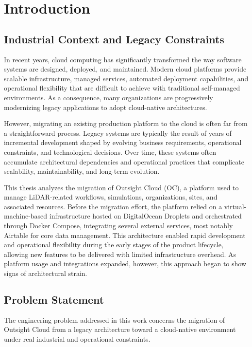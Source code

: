 \chapter{Introduction}

\section{Industrial Context and Legacy Constraints}
In recent years, cloud computing has significantly transformed the way software systems are designed, deployed, and maintained. Modern cloud platforms provide scalable infrastructure, managed services, automated deployment capabilities, and operational flexibility that are difficult to achieve with traditional self-managed environments. As a consequence, many organizations are progressively modernizing legacy applications to adopt cloud-native architectures.

However, migrating an existing production platform to the cloud is often far from a straightforward process. Legacy systems are typically the result of years of incremental development shaped by evolving business requirements, operational constraints, and technological decisions. Over time, these systems often accumulate architectural dependencies and operational practices that complicate scalability, maintainability, and long-term evolution.

This thesis analyzes the migration of Outsight Cloud (OC), a platform used to manage LiDAR-related workflows, simulations, organizations, sites, and associated resources. Before the migration effort, the platform relied on a virtual-machine-based infrastructure hosted on DigitalOcean Droplets and orchestrated through Docker Compose, integrating several external services, most notably Airtable for core data management. This architecture enabled rapid development and operational flexibility during the early stages of the product lifecycle, allowing new features to be delivered with limited infrastructure overhead. As platform usage and integrations expanded, however, this approach began to show signs of architectural strain.

\section{Problem Statement}
The engineering problem addressed in this work concerns the migration of Outsight Cloud from a legacy architecture toward a cloud-native environment under real industrial and operational constraints.

